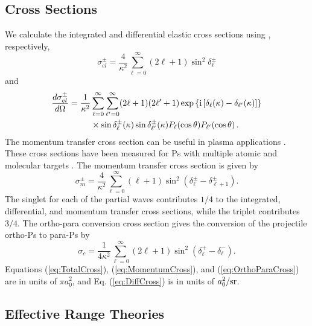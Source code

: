 \documentclass[preprint,showpacs,showkeys,preprintnumbers,amsmath,amssymb,longbibliography,pra,aps]{revtex4-1}
\newcommand{\ii}{{\rm{i}}}
\begin{document}
\subsection{Cross Sections}

We calculate the integrated and differential elastic cross sections using
\cite{Bransden2003}, respectively,
\begin{equation}
\label{eq:TotalCross}
\sigma_{el}^\pm = \frac{4}{\kappa^2} \sum_{\ell=0}^\infty (2\ell+1) \sin^2
   \delta_\ell^\pm
\end{equation}
and
\begin{align}
\label{eq:DiffCross}
\nonumber \frac{d\sigma_{el}^\pm}{d\Omega} = \frac{1}{\kappa^2} & \sum_{\ell=0}
  ^\infty \sum_{\ell^\prime=0}^\infty (2\ell+1)(2\ell^\prime+1) \exp
  \left\{\ii \left[\delta_\ell(\kappa) - \delta_{\ell^\prime}(\kappa) \right]
  \right\} \\
& \times \sin\delta_\ell^\pm(\kappa) \sin\delta_{\ell^\prime}^\pm(\kappa) P_\ell
  (\cos\theta) P_{\ell^\prime}(\cos\theta)\,.
\end{align}
The momentum transfer cross section can be useful in plasma applications
\cite{Wang2014, McEachran2014}. These cross sections have been measured for Ps
with multiple atomic and molecular targets \cite{Nagashima1998,Saito2003}. The
momentum transfer cross section is given by \cite{Bransden2003}
\begin{equation}
\label{eq:MomentumCross}
\sigma_{m}^\pm = \frac{4}{\kappa^2} \sum_{\ell=0}^\infty (\ell+1) \sin^2
  (\delta_\ell^\pm - \delta_{\ell+1}^\pm) .
\end{equation}
The singlet for each of the partial waves contributes $1/4$ to the integrated,
differential, and momentum transfer cross sections, while the triplet
contributes $3/4$. The ortho-para conversion cross section gives the conversion
of the projectile ortho-Ps to para-Ps by \cite{Hara1975}
\begin{equation}
\label{eq:OrthoParaCross}
\sigma_{c} = \frac{1}{4 \kappa^2} \sum_{\ell=0}^\infty (2 \ell+1) \sin^2
  (\delta_\ell^+ - \delta_\ell^-).
\end{equation}
Equations (\ref{eq:TotalCross}), (\ref{eq:MomentumCross}), and
(\ref{eq:OrthoParaCross}) are in units of $\pi a_0^2$, and
Eq. (\ref{eq:DiffCross}) is in units of $a_0^2 / \rm{sr}$. 


\subsection{Effective Range Theories}
\end{document}
